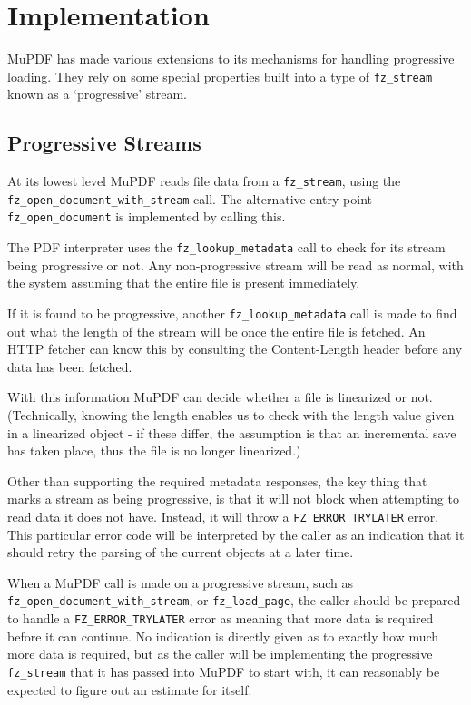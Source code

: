 \documentclass[oneside]{book}
\begin{document}
\section{Implementation}

MuPDF has made various extensions to its mechanisms for handling
progressive loading. They rely on some special properties built into a type of \texttt{fz\_stream} known as a `progressive' stream.

\subsection{Progressive Streams}

At its lowest level MuPDF reads file data from a \texttt{fz\_stream}, using the \texttt{fz\_open\_document\_with\_stream} call. The alternative entry point \texttt{fz\_open\_document} is implemented by calling this.

The PDF interpreter uses the \texttt{fz\_lookup\_metadata} call to check for its stream being progressive or not. Any non-progressive stream will be read as normal, with the system assuming that the entire file is present immediately.

If it is found to be progressive, another \texttt{fz\_lookup\_metadata} call is made to find out what the length of the stream will be once the  entire file is fetched. An HTTP fetcher can know this by consulting the Content-Length header before any data has been fetched.

With this information MuPDF can decide whether a file is linearized or not. (Technically, knowing the length enables us to check with the length value given in a linearized object - if these differ, the assumption is that an incremental save has taken place, thus the file is no longer linearized.)

Other than supporting the required metadata responses, the key thing that marks a stream as being progressive, is that it will not block when attempting to read data it does not have. Instead, it will throw a \texttt{FZ\_ERROR\_TRYLATER} error. This particular error code will be interpreted by the caller as an indication that it should retry the parsing of the current objects at a later time.

When a MuPDF call is made on a progressive stream, such as \texttt{fz\_open\_document\_with\_stream}, or \texttt{fz\_load\_page}, the caller should be prepared to handle a \texttt{FZ\_ERROR\_TRYLATER} error as meaning that more data is required before it can continue. No indication is directly given as to exactly how much more data is required, but as the caller will be implementing the progressive \texttt{fz\_stream} that it has passed into MuPDF to start with, it can reasonably be expected to figure out an estimate for itself.
\end{document}
